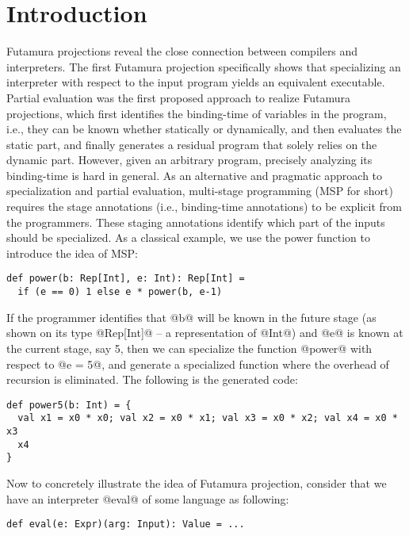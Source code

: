 \section{Introduction}

Futamura projections \cite{Futamura1999, futamura1971partial} reveal the close
connection between compilers and interpreters. The first Futamura projection
specifically shows that specializing an interpreter with respect to the input
program yields an equivalent executable. Partial evaluation
\cite{DBLP:books/daglib/0072559} was the first proposed approach to realize
Futamura projections, which first identifies the binding-time of variables in
the program, i.e., they can be known whether statically or dynamically, and then
evaluates the static part, and finally generates a residual program that solely
relies on the dynamic part. However, given an arbitrary program, precisely
analyzing its binding-time is hard in general. As an alternative and pragmatic
approach to specialization and partial evaluation, multi-stage programming (MSP
for short) \cite{taha1999multi, DBLP:conf/pepm/TahaS97} requires the stage
annotations (i.e., binding-time annotations) to be explicit from the programmers.
These staging annotations identify which part of the inputs should be
specialized. As a classical example, we use the power function to introduce
the idea of MSP:

\begin{lstlisting}
def power(b: Rep[Int], e: Int): Rep[Int] = 
  if (e == 0) 1 else e * power(b, e-1)
\end{lstlisting}

If the programmer identifies that @b@ will be known in the future stage (as shown
on its type @Rep[Int]@ -- a representation of @Int@) and @e@ is known at the
current stage, say 5, then we can specialize the function @power@ with
respect to @e = 5@, and generate a specialized function where the overhead of
recursion is eliminated. The following is the generated code:

\begin{lstlisting}
def power5(b: Int) = {
  val x1 = x0 * x0; val x2 = x0 * x1; val x3 = x0 * x2; val x4 = x0 * x3
  x4
}
\end{lstlisting}

Now to concretely illustrate the idea of Futamura projection, consider that we
have an interpreter @eval@ of some language as following:

\begin{lstlisting}
def eval(e: Expr)(arg: Input): Value = ...
\end{lstlisting}

